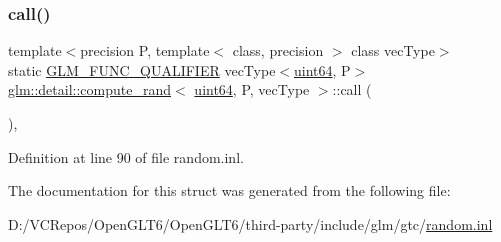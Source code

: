 \subsubsection{\texorpdfstring{call()}{call()}}
{\footnotesize\ttfamily template$<$precision P, template$<$ class, precision $>$ class vec\+Type$>$ \\
static \mbox{\hyperlink{setup_8hpp_a33fdea6f91c5f834105f7415e2a64407}{G\+L\+M\+\_\+\+F\+U\+N\+C\+\_\+\+Q\+U\+A\+L\+I\+F\+I\+ER}} vec\+Type$<$\mbox{\hyperlink{namespaceglm_1_1detail_adec4b19bf4982125e122db2fe03c5810}{uint64}}, P$>$ \mbox{\hyperlink{structglm_1_1detail_1_1compute__rand}{glm\+::detail\+::compute\+\_\+rand}}$<$ \mbox{\hyperlink{namespaceglm_1_1detail_adec4b19bf4982125e122db2fe03c5810}{uint64}}, P, vec\+Type $>$\+::call (\begin{DoxyParamCaption}{ }\end{DoxyParamCaption})\hspace{0.3cm}{\ttfamily [inline]}, {\ttfamily [static]}}



Definition at line 90 of file random.\+inl.



The documentation for this struct was generated from the following file\+:\begin{DoxyCompactItemize}
\item 
D\+:/\+V\+C\+Repos/\+Open\+G\+L\+T6/\+Open\+G\+L\+T6/third-\/party/include/glm/gtc/\mbox{\hyperlink{random_8inl}{random.\+inl}}\end{DoxyCompactItemize}
